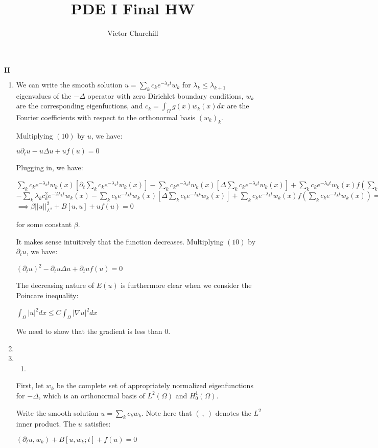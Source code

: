 \documentclass[12pt, letterpaper]{article}
\title{\vspace{-3ex}
{\bf \Large PDE I Final HW} \vspace{-1ex}}
\author{Victor Churchill}
\date{}
\begin{document}
\maketitle


$\mathbf{II}$
\begin{enumerate}
\item We can write the smooth solution $u=\sum\limits_kc_ke^{-\lambda_kt}w_k$ for $\lambda_k\le\lambda_{k+1}$ eigenvalues of the $-\Delta$ operator with zero Dirichlet boundary conditions, $w_k$ are the corresponding eigenfuctions, and $c_k=\int_\Omega g(x)w_k(x)dx$ are the Fourier coefficients with respect to the orthonormal basis $(w_k)_k$.

Multiplying $(10)$ by $u$, we have:
\begin{center}
$u\partial_tu-u\Delta u +uf(u)=0$
\end{center}
Plugging in, we have:
\begin{center}
$\sum\limits_kc_ke^{-\lambda_kt}w_k(x)[\partial_t\sum\limits_kc_ke^{-\lambda_kt}w_k(x)]-\sum\limits_kc_ke^{-\lambda_kt}w_k(x)[\Delta\sum\limits_kc_ke^{-\lambda_kt}w_k(x)]+\sum\limits_kc_ke^{-\lambda_kt}w_k(x)f(\sum\limits_kc_ke^{-\lambda_kt}w_k(x))=0$\\
$-\sum\limits_k\lambda_kc_k^2e^{-2\lambda_kt}w_k(x)-\sum\limits_kc_ke^{-\lambda_kt}w_k(x)[\Delta\sum\limits_kc_ke^{-\lambda_kt}w_k(x)]+\sum\limits_kc_ke^{-\lambda_kt}w_k(x)f(\sum\limits_kc_ke^{-\lambda_kt}w_k(x))=0$\\
$\implies \beta ||u||_{L^2}^2 + B[u,u]+uf(u)=0$\\
\end{center}
for some constant $\beta$.

It makes sense intuitively that the function decreases. Multiplying $(10)$ by $\partial_tu$, we have:
\begin{center}
$(\partial_tu)^2-\partial_tu\Delta u +\partial_tuf(u)=0$
\end{center}
The decreasing nature of $E(u)$ is furthermore clear when we consider the Poincare inequality:
\begin{center}
$\int_\Omega|u|^2dx\le C\int_\Omega|\nabla u|^2dx$
\end{center}
We need to show that the gradient is less than $0$.

\item 

\item \begin{enumerate}
\item 

\end{enumerate}


First, let ${w_k}$ be the complete set of appropriately normalized eigenfunctions for $-\Delta$, which is an orthonormal basis of $L^2(\Omega)$ and $H_0^1(\Omega)$.

Write the smooth solution $u=\sum\limits_kc_kw_k$. Note here that $(\: , \:)$ denotes the $L^2$ inner product. The $u$ satisfies:
\begin{center}
$(\partial_tu,w_k)+B[u,w_k;t]+f(u)=0$
\end{center}

\end{enumerate}
\end{document}

